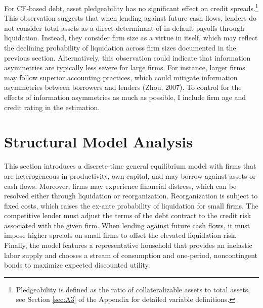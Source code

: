 \documentclass[12pt]{article}
\begin{document}
For CF-based debt, asset pledgeability has no significant effect on credit spreads.\footnote{Pledgeability is defined as the ratio of collateralizable assets to total assets, see Section \ref{sec:A3} of the Appendix for detailed variable definitions.}  This observation suggests that when lending against future cash flows, lenders do not consider total assets as a direct determinant of in-default payoffs through liquidation. Instead, they consider firm size as a virtue in itself, which may reflect the declining probability of liquidation across firm sizes documented in the previous section. Alternatively, this observation could indicate that information asymmetries are typically less severe for large firms. For instance, larger firms may follow superior accounting practices, which could mitigate information asymmetries between borrowers and lenders (Zhou, 2007). To control for the effects of information asymmetries as much as possible, I include firm age and credit rating in the estimation.

\section{Structural Model Analysis} \label{sec:model}
This section introduces a discrete-time general equilibrium model with firms that are heterogeneous in productivity, own capital, and may borrow against assets or cash flows. Moreover, firms may experience financial distress, which can be resolved either through liquidation or reorganization. Reorganization is subject to fixed costs, which raises the ex-ante probability of liquidation for small firms. The competitive lender must adjust the terms of the debt contract to the credit risk associated with the given firm. When lending against future cash flows, it must impose higher spreads on small firms to offset the elevated liquidation risk. Finally, the model features a representative household that provides an inelastic labor supply and chooses a stream of consumption and one-period, noncontingent bonds to maximize expected discounted utility.
\end{document}

